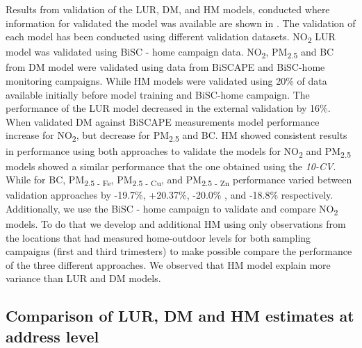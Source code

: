 \documentclass{article}
\begin{document}
Results from validation of the LUR, DM, and HM models, conducted where information for validated the model was available are shown in . The validation of each model has been conducted using different validation datasets. NO\textsubscript{2} LUR model was validated using BiSC - home campaign data. NO\textsubscript{2}, PM\textsubscript{2.5} and BC from DM model were validated using data from BiSCAPE and BiSC-home monitoring campaigns. While HM models were validated using 20\% of data available initially before model training and BiSC-home campaign. The performance of the LUR model decreased in the external validation by 16\%. When validated DM against BiSCAPE measurements model performance increase for NO\textsubscript{2}, but decrease for PM\textsubscript{2.5} and BC. HM showed consistent results in performance using both approaches to validate the models for NO\textsubscript{2} and PM\textsubscript{2.5} models showed a similar performance that the one obtained using the \textit{10-CV}. While for BC, PM\textsubscript{2.5 - Fe}, PM\textsubscript{2.5 - Cu}, and PM\textsubscript{2.5 - Zn} performance varied between validation approaches by -19.7\%, +20.37\%, -20.0\% , and -18.8\% respectively. Additionally, we use the BiSC - home campaign to validate and compare NO\textsubscript{2} models. To do that we develop and additional HM using only observations from the locations that had measured home-outdoor levels for both sampling campaigns (first and third trimesters) to make possible compare the performance of the three different approaches. We observed that HM model explain more variance than LUR and DM models. 

\subsection{Comparison of LUR, DM and HM estimates at address level} %
\end{document}
